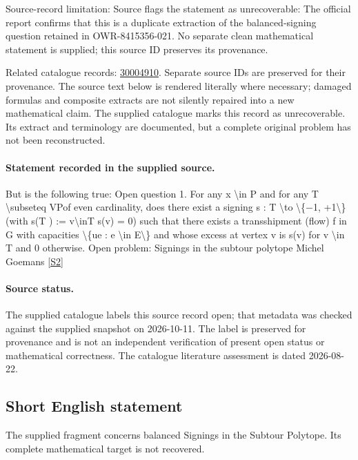 \documentclass[11pt]{article}
\begin{document}
Source-record limitation: Source flags the statement as unrecoverable: The official report confirms that this is a duplicate extraction of the balanced-signing question retained in OWR-8415356-021. No separate clean mathematical statement is supplied; this source ID preserves its provenance.

Related catalogue records: \href{https://mehmetmars7.github.io/Erdosproblems-llm-hunter/problem.html?type=open_problems&id=30004910}{30004910}. Separate source IDs are preserved for their provenance.
The source text below is rendered literally where necessary; damaged formulas and composite extracts are not silently repaired into a new mathematical claim.
The supplied catalogue marks this record as unrecoverable. Its extract and terminology are documented, but a complete original problem has not been reconstructed.
\paragraph{Statement recorded in the supplied source.}
But is the following true: Open question 1. For any x \textbackslash{}in P and for any T \textbackslash{}subseteq VPof even cardinality, does there exist a signing s : T \textbackslash{}to \textbackslash{}\{−1, +1\textbackslash{}\} (with s(T ) := v\textbackslash{}inT s(v) = 0) such that there exists a transshipment (flow) f in G with capacities \textbackslash{}\{ue : e \textbackslash{}in E\textbackslash{}\} and whose excess at vertex v is s(v) for v \textbackslash{}in T and 0 otherwise. Open problem: Signings in the subtour polytope Michel Goemans \href{https://doi.org/10.4171/owr/2021/53}{[S2]}
\paragraph{Source status.}
The supplied catalogue labels this source record open; that metadata was checked against the supplied snapshot on 2026-10-11. The label is preserved for provenance and is not an independent verification of present open status or mathematical correctness. The catalogue literature assessment is dated 2026-08-22.
\subsection{Short English statement}
The supplied fragment concerns balanced Signings in the Subtour Polytope. Its complete mathematical target is not recovered.
\end{document}
